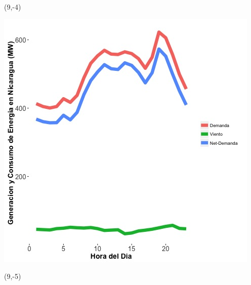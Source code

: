 \documentclass{article}\usepackage[]{graphicx}\usepackage[]{color}
\newenvironment{knitrout}{}{} %
\begin{document}
 \begin{textblock}{1}(9,-4)
\begin{minipage}{20em}
\begingroup

\endgroup
\end{minipage}
\end{textblock}

 \vspace{2cm}


%

\begin{knitrout}
\color{fgcolor}
\includegraphics[scale=0.65]{figure/gridplot1.jpg} 
\end{knitrout}

 \begin{textblock}{1}(9,-5)
\begin{minipage}{20em}
\begingroup

\endgroup
\end{minipage}
\end{textblock}
\end{document}
